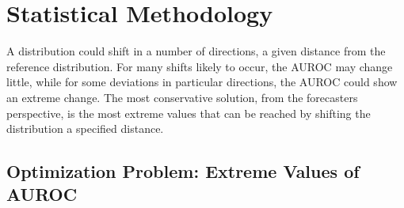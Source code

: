 


\section{Statistical Methodology} \label{sec:theory}





A distribution could shift in a number of directions, a given distance from the reference distribution.
For many shifts likely to occur, the AUROC may change little, while for some deviations in particular directions, the AUROC could show an extreme change.
The most conservative solution, from the forecasters perspective, is the most extreme values that can be reached by shifting the distribution a specified distance.



\subsection{Optimization Problem: Extreme Values of AUROC}

